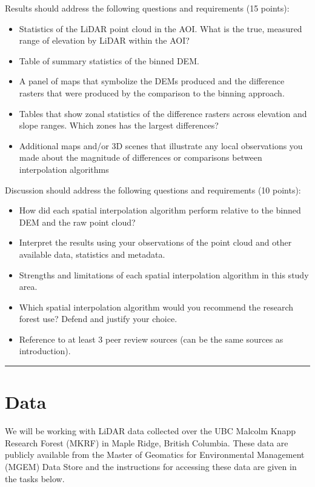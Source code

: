 \documentclass[
]{book}
\begin{document}
Results should address the following questions and requirements (15 points):

\begin{itemize}
\item
  Statistics of the LiDAR point cloud in the AOI. What is the true, measured range of elevation by LiDAR within the AOI?
\item
  Table of summary statistics of the binned DEM.
\item
  A panel of maps that symbolize the DEMs produced and the difference rasters that were produced by the comparison to the binning approach.
\item
  Tables that show zonal statistics of the difference rasters across elevation and slope ranges. Which zones has the largest differences?
\item
  Additional maps and/or 3D scenes that illustrate any local observations you made about the magnitude of differences or comparisons between interpolation algorithms
\end{itemize}

Discussion should address the following questions and requirements (10 points):

\begin{itemize}
\item
  How did each spatial interpolation algorithm perform relative to the binned DEM and the raw point cloud?
\item
  Interpret the results using your observations of the point cloud and other available data, statistics and metadata.
\item
  Strengths and limitations of each spatial interpolation algorithm in this study area.
\item
  Which spatial interpolation algorithm would you recommend the research forest use? Defend and justify your choice.
\item
  Reference to at least 3 peer review sources (can be the same sources as introduction).
\end{itemize}

\begin{center}\rule{0.5\linewidth}{0.5pt}\end{center}

\hypertarget{data}{%
\section*{Data}\label{data}}

We will be working with LiDAR data collected over the UBC Malcolm Knapp Research Forest (MKRF) in Maple Ridge, British Columbia. These data are publicly available from the Master of Geomatics for Environmental Management (MGEM) Data Store and the instructions for accessing these data are given in the tasks below.
\end{document}
